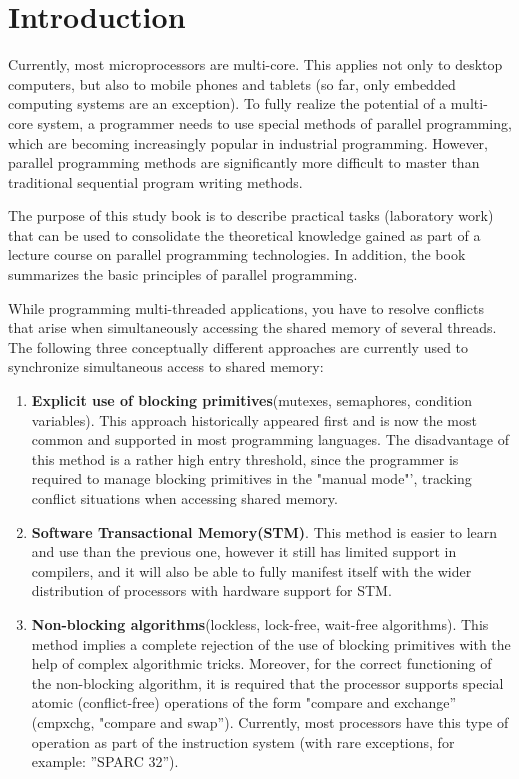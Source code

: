 { %
	\section*{Introduction}
	\par Currently, most microprocessors are multi-core. This applies not only to desktop computers, but also to mobile phones and tablets (so far, only embedded computing systems are an exception). To fully realize the potential of a multi-core system, a programmer needs to use special methods of parallel programming, which are becoming increasingly popular in industrial programming. However, parallel programming methods are significantly more difficult to master than traditional sequential program writing methods.
	\par The purpose of this study book is to describe practical tasks (laboratory work) that can be used to consolidate the theoretical knowledge gained as part of a lecture course on parallel programming technologies. In addition, the book summarizes the basic principles of parallel programming.%
	\par While programming multi-threaded applications, you have to resolve conflicts that arise when simultaneously accessing the shared memory of several threads. The following three conceptually different approaches are currently used to synchronize simultaneous access to shared memory:
	\begin{enumerate}
		\item\textbf{Explicit use of blocking primitives}\quad(mutexes, semaphores, condition variables). This approach historically appeared first and is now the most common and supported in most programming languages. The disadvantage of this method is a rather high entry threshold, since the programmer is required to manage blocking primitives in the  "manual mode"', tracking conflict situations when accessing shared memory.
		\item\textbf{Software Transactional Memory(STM)}. This method is easier to learn and use than the previous one, however it still has limited support in compilers, and it will also be able to fully manifest itself with the wider distribution of processors with hardware support for STM.
		\item\textbf{Non-blocking algorithms}\quad(lockless, lock-free, wait-free algorithms). This method implies a complete rejection of the use of blocking primitives with the help of complex algorithmic tricks. Moreover, for the correct functioning of the non-blocking algorithm, it is required that the processor supports special atomic (conflict-free) operations of the form "compare and exchange'' (cmpxchg, "compare and swap''). Currently, most processors have this type of operation as part of the instruction system (with rare exceptions, for example: ''SPARC 32'').

\end{enumerate}}

